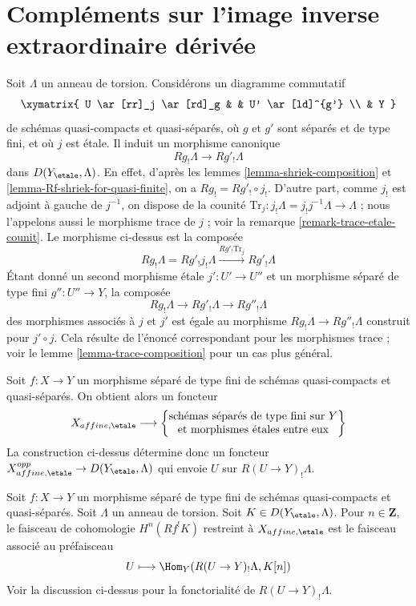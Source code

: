 






\section{Compléments sur l'image inverse extraordinaire dérivée}
\label{section-more-derived-upper-shriek}

\noindent
Soit $\Lambda$ un anneau de torsion. Considérons un diagramme commutatif
$$
\xymatrix{
U \ar[rr]_j \ar[rd]_g & & U' \ar[ld]^{g'} \\
& Y
}
$$
de schémas quasi-compacts et quasi-séparés, où $g$ et $g'$
sont séparés et de type fini, et où $j$ est étale. Il induit
un morphisme canonique
$$
Rg_!\Lambda \longrightarrow Rg'_!\Lambda
$$
dans $D(Y_\etale, \Lambda)$. En effet, d'après les lemmes \ref{lemma-shriek-composition}
et \ref{lemma-Rf-shriek-for-quasi-finite}, on a $Rg_! = Rg'_! \circ j_!$.
D'autre part, comme $j_!$ est adjoint à gauche de $j^{-1}$, on dispose de
la counité $\text{Tr}_j : j_!\Lambda = j_!j^{-1}\Lambda \to \Lambda$ ;
nous l'appelons aussi le morphisme trace de $j$ ; voir la
remarque \ref{remark-trace-etale-counit}.
Le morphisme ci-dessus est la composée
$$
Rg_!\Lambda = Rg'_!j_!\Lambda
\xrightarrow{Rg'_! \text{Tr}_j}
Rg'_!\Lambda
$$
Étant donné un second morphisme étale $j' : U' \to U''$
et un morphisme séparé de type fini $g'' : U'' \to Y$,
la composée
$$
Rg_!\Lambda \longrightarrow Rg'_!\Lambda \longrightarrow Rg''_!\Lambda
$$
des morphismes associés à $j$ et $j'$ est égale au morphisme
$Rg_!\Lambda \longrightarrow Rg''_!\Lambda$ construit pour $j' \circ j$.
Cela résulte de l'énoncé correspondant pour les morphismes trace ;
voir le lemme \ref{lemma-trace-composition} pour un cas plus général.

\medskip\noindent
Soit $f : X \to Y$ un morphisme séparé de type fini de schémas quasi-compacts
et quasi-séparés. On obtient alors un foncteur
$$
X_{affine, \etale}
\longrightarrow
\left\{
\begin{matrix}
\text{schémas séparés de type fini sur }Y\\
\text{et morphismes étales entre eux}
\end{matrix}
\right\}
$$
La construction ci-dessus détermine donc un foncteur
$X_{affine, \etale}^{opp} \to D(Y_\etale, \Lambda)$
qui envoie $U$ sur $R(U \to Y)_!\Lambda$.

\begin{lemma}
\label{lemma-describe-Rf-upper-shriek}
Soit $f : X \to Y$ un morphisme séparé de type fini de schémas quasi-compacts
et quasi-séparés. Soit $\Lambda$ un anneau de torsion.
Soit $K \in D(Y_\etale, \Lambda)$. Pour $n \in \mathbf{Z}$, le
faisceau de cohomologie $H^n(Rf^!K)$ restreint à $X_{affine, \etale}$
est le faisceau associé au préfaisceau
$$
U \longmapsto \Hom_Y(R(U \to Y)_!\Lambda, K[n])
$$
Voir la discussion ci-dessus pour la fonctorialité de $R(U \to Y)_!\Lambda$.
\end{lemma}

